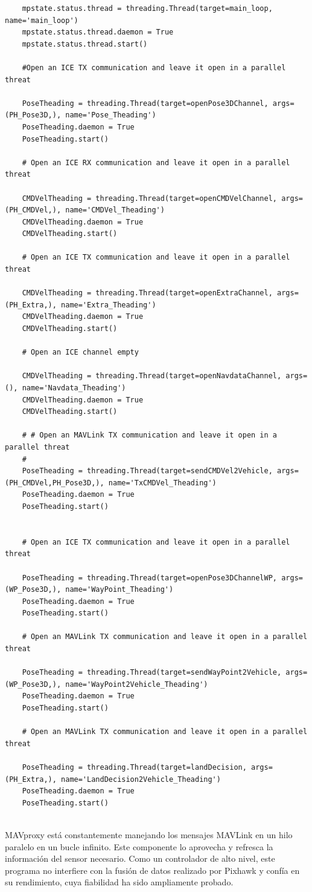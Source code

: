 {\scriptsize
\begin{verbatim}
	mpstate.status.thread = threading.Thread(target=main_loop, name='main_loop')
    mpstate.status.thread.daemon = True
    mpstate.status.thread.start()

    #Open an ICE TX communication and leave it open in a parallel threat

    PoseTheading = threading.Thread(target=openPose3DChannel, args=(PH_Pose3D,), name='Pose_Theading')
    PoseTheading.daemon = True
    PoseTheading.start()

    # Open an ICE RX communication and leave it open in a parallel threat

    CMDVelTheading = threading.Thread(target=openCMDVelChannel, args=(PH_CMDVel,), name='CMDVel_Theading')
    CMDVelTheading.daemon = True
    CMDVelTheading.start()

    # Open an ICE TX communication and leave it open in a parallel threat

    CMDVelTheading = threading.Thread(target=openExtraChannel, args=(PH_Extra,), name='Extra_Theading')
    CMDVelTheading.daemon = True
    CMDVelTheading.start()

    # Open an ICE channel empty

    CMDVelTheading = threading.Thread(target=openNavdataChannel, args=(), name='Navdata_Theading')
    CMDVelTheading.daemon = True
    CMDVelTheading.start()

    # # Open an MAVLink TX communication and leave it open in a parallel threat
    #
    PoseTheading = threading.Thread(target=sendCMDVel2Vehicle, args=(PH_CMDVel,PH_Pose3D,), name='TxCMDVel_Theading')
    PoseTheading.daemon = True
    PoseTheading.start()


    # Open an ICE TX communication and leave it open in a parallel threat

    PoseTheading = threading.Thread(target=openPose3DChannelWP, args=(WP_Pose3D,), name='WayPoint_Theading')
    PoseTheading.daemon = True
    PoseTheading.start()

    # Open an MAVLink TX communication and leave it open in a parallel threat

    PoseTheading = threading.Thread(target=sendWayPoint2Vehicle, args=(WP_Pose3D,), name='WayPoint2Vehicle_Theading')
    PoseTheading.daemon = True
    PoseTheading.start()

    # Open an MAVLink TX communication and leave it open in a parallel threat

    PoseTheading = threading.Thread(target=landDecision, args=(PH_Extra,), name='LandDecision2Vehicle_Theading')
    PoseTheading.daemon = True
    PoseTheading.start()
   
\end{verbatim}}

MAVproxy está constantemente manejando los mensajes MAVLink en un hilo paralelo en un bucle infinito. Este componente lo aprovecha y refresca la información del sensor necesario. Como un controlador de alto nivel, este programa no interfiere con la fusión de datos realizado por Pixhawk y confía en su rendimiento, cuya fiabilidad ha sido ampliamente probado.
